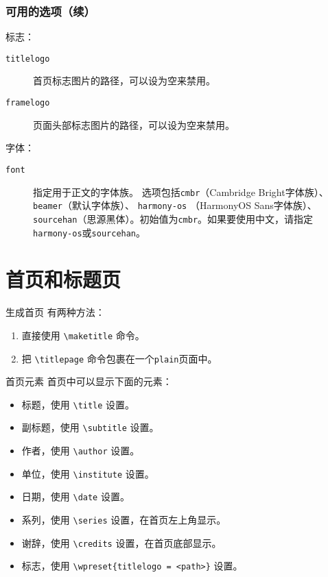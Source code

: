 \documentclass[no-math, aspectratio=1610, 10pt]{beamer}
\begin{document}
    \begin{frame}
        \frametitle{可用的选项（续）}

        标志：
        \begin{description}
            \item[\texttt{titlelogo}] 首页标志图片的路径，可以设为空来禁用。
            \item[\texttt{framelogo}] 页面头部标志图片的路径，可以设为空来禁用。
        \end{description}
    
        字体：
        \begin{description}
            \item[\texttt{font}] 指定用于正文的字体族。 选项包括\texttt{cmbr}（Cambridge Bright字体族）、 \texttt{beamer}（默认字体族）、 \texttt{harmony-os} （HarmonyOS Sans字体族）、\texttt{sourcehan}（思源黑体）。初始值为\texttt{cmbr}。如果要使用中文，请指定\texttt{harmony-os}或\texttt{sourcehan}。
        \end{description}
    \end{frame}

    \section{首页和标题页}

    \begin{frame}[fragile]{生成首页}
        有两种方法：
        \begin{enumerate}
            \item 直接使用 \verb|\maketitle| 命令。
            \item 把 \verb|\titlepage| 命令包裹在一个\texttt{plain}页面中。
        \end{enumerate}
    \end{frame}

    \begin{frame}[fragile]{首页元素}
        首页中可以显示下面的元素：
        \begin{itemize}
            \item 标题，使用 \verb|\title| 设置。
            \item 副标题，使用 \verb|\subtitle| 设置。
            \item 作者，使用 \verb|\author| 设置。
            \item 单位，使用 \verb|\institute| 设置。
            \item 日期，使用 \verb|\date| 设置。
            \item 系列，使用 \verb|\series| 设置，在首页左上角显示。
            \item 谢辞，使用 \verb|\credits| 设置，在首页底部显示。
            \item 标志，使用 \verb|\wpreset{titlelogo = <path>}| 设置。
        \end{itemize}
    \end{frame}
\end{document}
